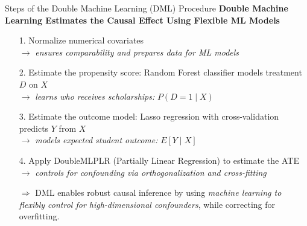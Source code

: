 \documentclass[aspectratio=169]{beamer}
\begin{document}
\begin{frame}{Steps of the Double Machine Learning (DML) Procedure}
\textbf{Double Machine Learning Estimates the Causal Effect Using Flexible ML Models}
\vspace{-3pt}
\begin{itemize}
    \item[1.] Normalize numerical covariates \\ 
    $\rightarrow$ \textit{ensures comparability and prepares data for ML models}
    \item[2.] Estimate the propensity score: Random Forest classifier models treatment $D$ on $X$ \\ 
    $\rightarrow$ \textit{learns who receives scholarships: } $P(D = 1 \mid X)$  
    \item[3.] Estimate the outcome model: Lasso regression with cross-validation predicts $Y$ from $X$ \\ 
    $\rightarrow$ \textit{models expected student outcome: } $E[Y \mid X]$
    \item[4.] Apply DoubleMLPLR (Partially Linear Regression) to estimate the ATE \\ 
    $\rightarrow$ \textit{controls for confounding via orthogonalization and cross-fitting}
\end{itemize}
\vspace{-3pt}
\begin{itemize}
    \item[$\Rightarrow$] DML enables robust causal inference by using \textit{machine learning to flexibly control for high-dimensional confounders}, while correcting for overfitting.
\end{itemize}
\vspace{-10pt}
\end{frame}
\end{document}
